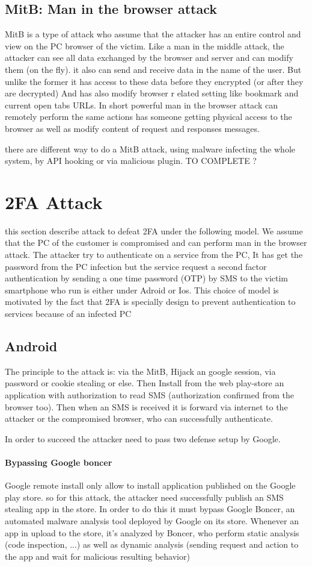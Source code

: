 \documentclass[11pt, a4paper,twocolumn]{article}
\begin{document}
\subsection{MitB: Man in the browser attack}
MitB is a type of attack who assume that the attacker has an entire control and view on the PC browser of the victim. Like a man in the middle attack, the attacker can see all data 
exchanged by the browser and server and can modify them (on the fly). it also can send and receive data in the name of the user. But unlike the former it has access to these data before they encrypted (or after they are decrypted) And has also modify browser r elated setting like bookmark and current open tabs URLs. In short powerful man in the browser attack can remotely perform the same actions has someone getting physical access to the browser as well as modify content of request and responses messages.

there are different way to do a MitB attack, using malware infecting the whole system, by API hooking or via malicious plugin. TO COMPLETE ?


\section{2FA Attack}
 this section describe attack to defeat 2FA under the following model. We assume that the PC of the customer is compromised and can perform man in the browser attack. The attacker try to authenticate on a service from the PC, It has get the password from the PC infection but the service request a second factor authentication by sending a one time password (OTP) by SMS to the victim smartphone who run is either under Adroid or Ios. 
This choice of model is motivated by the fact that 2FA is specially design to prevent authentication to services because of an infected PC 
\subsection{Android}
The principle to the attack is: via the MitB, Hijack an google session, via password or cookie stealing or else. Then Install from the web play-store an application with authorization to read SMS (authorization confirmed from the browser too). Then when an SMS is received it is forward via internet to the attacker or the compromised browser, who can successfully authenticate.

In order to succeed the attacker need to pass two defense setup by Google.

\paragraph{Bypassing Google boncer} Google remote install only allow to install application published on the Google play store. so for this attack, the attacker need successfully publish an SMS stealing app in the store. In order to do this it must bypass Google Boncer, an automated malware analysis tool deployed by Google on its store. Whenever an app in upload to the store, it's analyzed by Boncer, who perform static analysis (code inspection, ...) as well as dynamic analysis (sending request and action to the app and wait for malicious resulting behavior)
\end{document}
